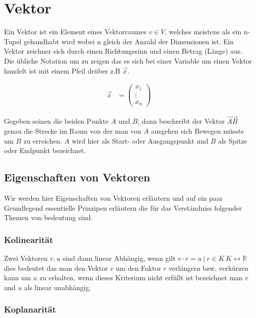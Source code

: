 \section{ Vektor }

Ein Vektor ist ein Element eines Vektorraumes $ v \in V $, welches meistens als ein n-Tupel gehandhabt wird wobei n gleich der Anzahl der Dimensionen ist. Ein Vektor zeichner sich durch einen Richtungssinn und einen Betrag (Länge) aus. Die übliche Notation um zu zeigen das es sich bei einer Variable um einen Vektor handelt ist mit einem Pfeil drüber z.B $ \overrightarrow{x} $.

\begin{align*}
\overrightarrow{x} &= 
\begin{pmatrix}
	x_1 \\ \vdots \\ x_n
\end{pmatrix} 
\end{align*} 


\noindent Gegeben seinen die beiden Punkte $A$ und $B$, dann beschreibt der Vektor $\overrightarrow{AB}$ genau die Strecke im Raum von der man von $A$ ausgehen sich Bewegen müsste um $B$ zu erreichen. $A$ wird hier als Start- oder Ausgangspunkt und $B$ als Spitze oder Endpunkt bezeichnet.

\subsection{Eigenschaften von Vektoren}

Wir werden hier Eigenschaften von Vektoren erläutern und auf ein paar Grundlegend essentielle Prinzipen erläutern die für das Verständniss folgender Themen von bedeutung sind.

\subsubsection{ Kolinearität }

Zwei Vektoren $v, u$ sind dann linear Abhängig, wenn gilt $ v \cdot r = u \ \vert \ r \in K \ K \leftrightarrow \mathbb{R} $ dies bedeutet das man den Vektor $ v $ um den Faktor $ r $ verlängern bzw. verkürzen kann um $u$ zu erhalten, wenn dieses Kriterium nicht erfüllt ist bezeichnet man $v$ und $u$ als linear unabhängig.

\subsubsection{ Koplanarität}

